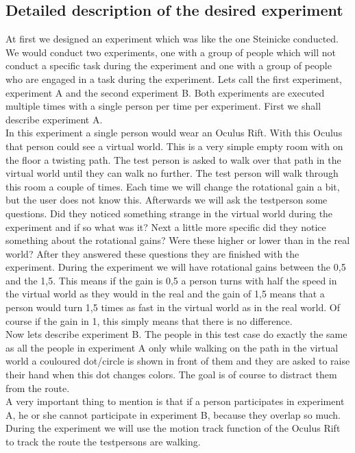 \subsection{Detailed description of the desired experiment}\label{sec:description}
At first we designed an experiment which was like the one Steinicke conducted. We would conduct two experiments, one with a group of people which will not conduct a specific task during the experiment and one with a group of people who are engaged in a task during the experiment. Lets call the first experiment, experiment A and the second experiment B. Both experiments are executed multiple times with a single person per time per experiment. First we shall describe experiment A.\\
In this experiment a single person would wear an Oculus Rift. With this Oculus that person could see a virtual world. This is a very simple empty room with on the floor a twisting path. The test person is asked to walk over that path in the virtual world until they can walk no further. The test person will walk through this room a couple of times. Each time we will change the rotational gain a bit, but the user does not know this. Afterwards we will ask the testperson some questions. Did they noticed something strange in the virtual world during the experiment and if so what was it? Next a little more specific did they notice something about the rotational gains? Were these higher or lower than in the real world? After they answered these questions they are finished with the experiment. During the experiment we will have rotational gains between the 0,5 and the 1,5. This means if the gain is 0,5 a person turns with half the speed in the virtual world as they would in the real and the gain of 1,5 means that a person would turn 1,5 times as fast in the virtual world as in the real world. Of course if the gain in 1, this simply means that there is no difference. \\
Now lets describe experiment B. The people in this test case do exactly the same as all the people in experiment A only while walking on the path in the virtual world a couloured dot/circle is shown in front of them and they are asked to raise their hand when this dot changes colors. The goal is of course to distract them from the route. \\
A very important thing to mention is that  if a person participates in experiment A, he or she cannot participate in experiment B, because they overlap so much. During the experiment we will use the motion track function of the Oculus Rift to track the route the testpersons are walking.

